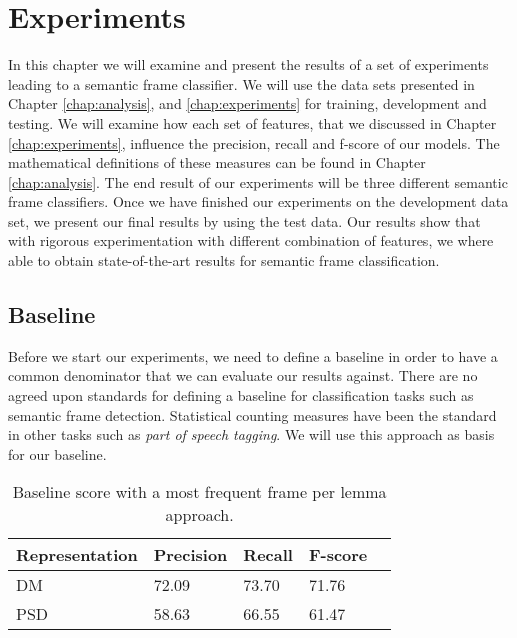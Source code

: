 \chapter{Experiments}
\label{chap:results}

In this chapter we will examine and present the results of a set of experiments leading to a semantic frame classifier. We will use the data sets presented in Chapter \ref{chap:analysis}, and \ref{chap:experiments} for training, development and testing. We will examine how each set of features, that we discussed in Chapter \ref{chap:experiments}, influence the precision, recall and f-score of our models. The mathematical definitions of these measures can be found in Chapter \ref{chap:analysis}. The end result of our experiments will be three different semantic frame classifiers. Once we have finished our experiments on the development data set, we present our final results by using the test data. Our results show that with rigorous experimentation with different combination of features, we where able to obtain state-of-the-art results for semantic frame classification.



\section{Baseline}

Before we start our experiments, we need to define a baseline in order to have a common denominator that we can evaluate our results against. There are no agreed upon standards for defining a baseline for classification tasks such as semantic frame detection. Statistical counting measures have been the standard in other tasks such as \textit{part of speech tagging}. We will use this approach as basis for our baseline.

\begin{table}
    \centering
    \smaller[0.2]
    \begin{tabular}{@{}lllll@{}}
        \toprule
        \textbf{Representation} & \textbf{Precision} & \textbf{Recall} & \textbf{F-score} \\
        \midrule
        DM & 72.09 & 73.70 & 71.76\\ 
        PSD & 58.63 & 66.55 & 61.47\\
        \bottomrule
    \end{tabular}
    \caption{Baseline score with a most frequent frame per lemma approach.}
    \label{table:baseline}
\end{table}

